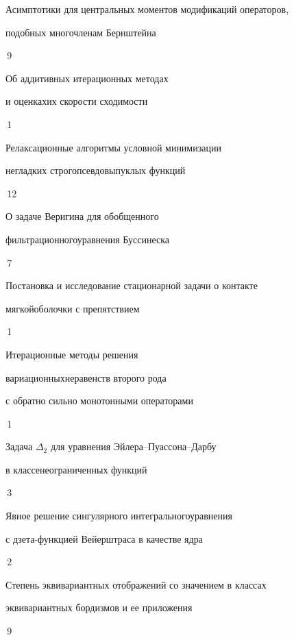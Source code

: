 

{Асимптотики для центральных моментов модификаций операторов, \newline


подобных многочленам Бернштейна}{\No\,9}




{Об аддитивных итерационных методах


и оценках\newline их скорости сходимости}{\No\,1}




{Релаксационные алгоритмы условной минимизации


негладких строго\newline псевдовыпуклых функций}{\No\,12}




{О задаче Веригина для обобщенного 


фильтрационного\newline уравнения Буссинеска}{\No\,7}




{Постановка и исследование стационарной задачи о контакте


мягкой\newline оболочки с препятствием}{\No\,1}




{Итерационные методы решения


вариационных\newline неравенств второго рода


с обратно сильно монотонными операторами}{\No\,1}




{Задача $\Delta_2$ для уравнения Эйлера--Пуассона--Дарбу  


в классе\newline неограниченных функций}{\No\,3}




{Явное решение сингулярного интегрального\newline уравнения


с дзета-функцией Вейерштраса в качестве ядра}{\No\,2}




{Степень эквивариантных отображений со значением в классах \newline 


эквивариантных бордизмов и ее приложения}{\No\,9}


